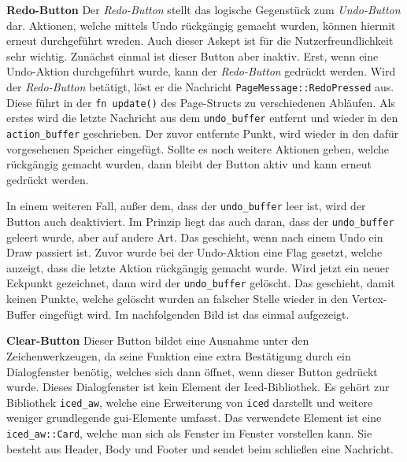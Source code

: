 \textbf{\small{Redo-Button}}\linebreak
Der \emph{Redo-Button} stellt das logische Gegenstück zum \emph{Undo-Button} dar. Aktionen, welche mittels Undo rückgängig gemacht wurden, können hiermit erneut durchgeführt wreden. Auch dieser Askept ist für die Nutzerfreundlichkeit sehr wichtig.
Zunächst einmal ist dieser Button aber inaktiv. Erst, wenn eine Undo-Aktion durchgeführt wurde, kann der \emph{Redo-Button} gedrückt werden.
Wird der \emph{Redo-Button} betätigt, löst er die Nachricht \lstinline{PageMessage::RedoPressed} aus. Diese führt in der \lstinline{fn update()} des Page-Structs zu verschiedenen Abläufen.
Als erstes wird die letzte Nachricht aus dem \lstinline{undo_buffer} entfernt und wieder in den \lstinline{action_buffer} geschrieben. Der zuvor entfernte Punkt, wird wieder in den dafür vorgesehenen Speicher eingefügt.
Sollte es noch weitere Aktionen geben, welche rückgängig gemacht wurden, dann bleibt der Button aktiv und kann erneut gedrückt werden.

In einem weiteren Fall, außer dem, dass der \lstinline{undo_buffer} leer ist, wird der Button auch deaktiviert. Im Prinzip liegt das auch daran, dass der \lstinline{undo_buffer} geleert wurde, aber auf andere Art.
Das geschieht, wenn nach einem Undo ein Draw passiert ist. Zuvor wurde bei der Undo-Aktion eine Flag gesetzt, welche anzeigt, dass die letzte Aktion rückgängig gemacht wurde. Wird jetzt ein neuer Eckpunkt gezeichnet, 
dann wird der \lstinline{undo_buffer} gelöscht. Das geschieht, damit keinen Punkte, welche gelöscht wurden an falscher Stelle wieder in den Vertex-Buffer eingefügt wird. Im nachfolgenden Bild ist das einmal aufgezeigt.
\linebreak

\textbf{\small{Clear-Button}}\linebreak
Dieser Button bildet eine Ausnahme unter den Zeichenwerkzeugen, da seine Funktion eine extra Bestätigung durch ein Dialogfenster benötig, welches sich dann öffnet, wenn dieser Button gedrückt wurde. 
Dieses Dialogfenster ist kein Element der Iced-Bibliothek. Es gehört zur Bibliothek \lstinline{iced_aw}, welche eine Erweiterung von \lstinline{iced} darstellt und weitere weniger grundlegende \ac{gui}-Elemente umfasst.
Das verwendete Element ist eine \lstinline{iced_aw::Card}, welche man sich als Fenster im Fenster vorstellen kann. Sie besteht aus Header, Body und Footer und sendet beim schließen eine Nachricht. 

